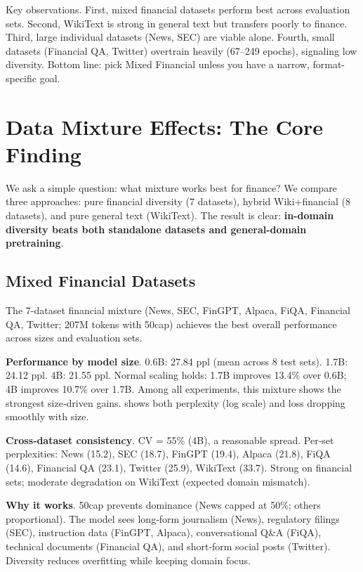 Key observations. First, mixed financial datasets perform best across evaluation sets. Second, WikiText is strong in general text but transfers poorly to finance. Third, large individual datasets (News, SEC) are viable alone. Fourth, small datasets (Financial QA, Twitter) overtrain heavily (67--249 epochs), signaling low diversity. Bottom line: pick Mixed Financial unless you have a narrow, format-specific goal.

\section{Data Mixture Effects: The Core Finding}

We ask a simple question: what mixture works best for finance? We compare three approaches: pure financial diversity (7 datasets), hybrid Wiki+financial (8 datasets), and pure general text (WikiText). The result is clear: \textbf{in-domain diversity beats both standalone datasets and general-domain pretraining}.

\subsection{Mixed Financial Datasets}

The 7-dataset financial mixture (News, SEC, FinGPT, Alpaca, FiQA, Financial QA, Twitter; 207M tokens with 50cap) achieves the best overall performance across sizes and evaluation sets.

\textbf{Performance by model size}. 0.6B: 27.84 ppl (mean across 8 test sets). 1.7B: 24.12 ppl. 4B: 21.55 ppl. Normal scaling holds: 1.7B improves 13.4\% over 0.6B; 4B improves 10.7\% over 1.7B. Among all experiments, this mixture shows the strongest size‑driven gains.  shows both perplexity (log scale) and loss dropping smoothly with size.

\textbf{Cross‑dataset consistency}. CV = 55\% (4B), a reasonable spread. Per‑set perplexities: News (15.2), SEC (18.7), FinGPT (19.4), Alpaca (21.8), FiQA (14.6), Financial QA (23.1), Twitter (25.9), WikiText (33.7). Strong on financial sets; moderate degradation on WikiText (expected domain mismatch).

\textbf{Why it works}. 50cap prevents dominance (News capped at 50\%; others proportional). The model sees long‑form journalism (News), regulatory filings (SEC), instruction data (FinGPT, Alpaca), conversational Q\&A (FiQA), technical documents (Financial QA), and short‑form social posts (Twitter). Diversity reduces overfitting while keeping domain focus.

